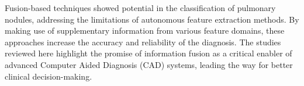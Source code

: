 Fusion-based techniques showed potential in the classification of pulmonary nodules, addressing the limitations of autonomous feature extraction methods. By making use of supplementary information from various feature domains, these approaches increase the accuracy and reliability of the diagnosis. The studies reviewed here highlight the promise of information fusion as a critical enabler of advanced Computer Aided Diagnosis (CAD) systems, leading the way for better clinical decision-making.